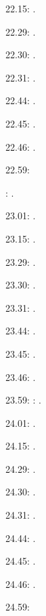 \label{key}\documentclass[italian]{article}
\begin{document}
22.15:     . 

22.29:     . 

22.30:     .

22.31:     .

22.44:     .

22.45:     .

22.46:     .

22.59:     

:    .

23.01:     . 

23.15:     . 

23.29:     . 

23.30:     .

23.31:     .

23.44:     .

23.45:     .

23.46:     .

23.59:     
:    .

24.01:     . 

24.15:     . 

24.29:     . 

24.30:     .

24.31:     .

24.44:     .

24.45:     .

24.46:     .

24.59:     
\end{document}
